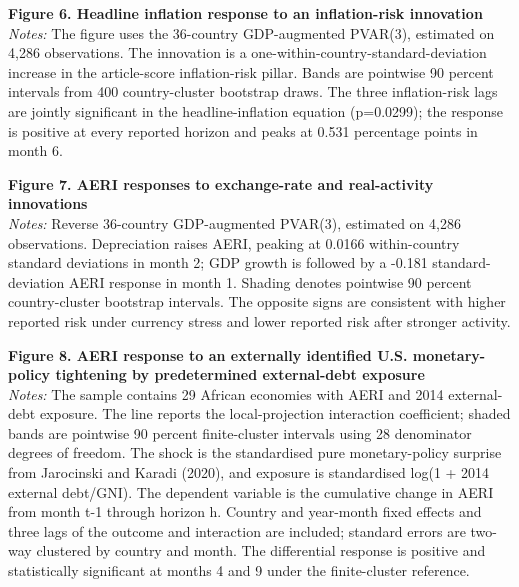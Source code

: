\noindent\textbf{Figure 6. Headline inflation response to an inflation-risk innovation}\\
\textit{Notes:} The figure uses the 36-country GDP-augmented PVAR(3), estimated on 4,286 observations. The innovation is a one-within-country-standard-deviation increase in the article-score inflation-risk pillar. Bands are pointwise 90 percent intervals from 400 country-cluster bootstrap draws. The three inflation-risk lags are jointly significant in the headline-inflation equation (p=0.0299); the response is positive at every reported horizon and peaks at 0.531 percentage points in month 6.\par\medskip

\noindent\textbf{Figure 7. AERI responses to exchange-rate and real-activity innovations}\\
\textit{Notes:} Reverse 36-country GDP-augmented PVAR(3), estimated on 4,286 observations. Depreciation raises AERI, peaking at 0.0166 within-country standard deviations in month 2; GDP growth is followed by a -0.181 standard-deviation AERI response in month 1. Shading denotes pointwise 90 percent country-cluster bootstrap intervals. The opposite signs are consistent with higher reported risk under currency stress and lower reported risk after stronger activity.\par\medskip

\noindent\textbf{Figure 8. AERI response to an externally identified U.S. monetary-policy tightening by predetermined external-debt exposure}\\
\textit{Notes:} The sample contains 29 African economies with AERI and 2014 external-debt exposure. The line reports the local-projection interaction coefficient; shaded bands are pointwise 90 percent finite-cluster intervals using 28 denominator degrees of freedom. The shock is the standardised pure monetary-policy surprise from Jarocinski and Karadi (2020), and exposure is standardised log(1 + 2014 external debt/GNI). The dependent variable is the cumulative change in AERI from month t-1 through horizon h. Country and year-month fixed effects and three lags of the outcome and interaction are included; standard errors are two-way clustered by country and month. The differential response is positive and statistically significant at months 4 and 9 under the finite-cluster reference.\par\medskip
